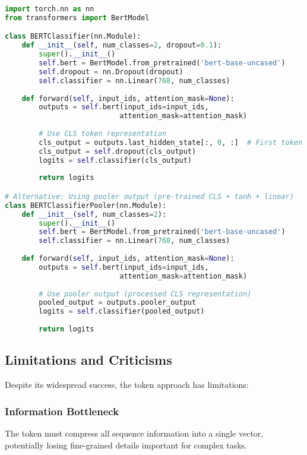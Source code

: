 \begin{lstlisting}[language=Python, caption=Fine-tuning CLS Token]
import torch.nn as nn
from transformers import BertModel

class BERTClassifier(nn.Module):
    def __init__(self, num_classes=2, dropout=0.1):
        super().__init__()
        self.bert = BertModel.from_pretrained('bert-base-uncased')
        self.dropout = nn.Dropout(dropout)
        self.classifier = nn.Linear(768, num_classes)
        
    def forward(self, input_ids, attention_mask=None):
        outputs = self.bert(input_ids=input_ids, 
                           attention_mask=attention_mask)
        
        # Use CLS token representation
        cls_output = outputs.last_hidden_state[:, 0, :]  # First token
        cls_output = self.dropout(cls_output)
        logits = self.classifier(cls_output)
        
        return logits

# Alternative: Using pooler output (pre-trained CLS + tanh + linear)
class BERTClassifierPooler(nn.Module):
    def __init__(self, num_classes=2):
        super().__init__()
        self.bert = BertModel.from_pretrained('bert-base-uncased')
        self.classifier = nn.Linear(768, num_classes)
        
    def forward(self, input_ids, attention_mask=None):
        outputs = self.bert(input_ids=input_ids, 
                           attention_mask=attention_mask)
        
        # Use pooler output (processed CLS representation)
        pooled_output = outputs.pooler_output
        logits = self.classifier(pooled_output)
        
        return logits
\end{lstlisting}

\subsection{Limitations and Criticisms}

Despite its widespread success, the \cls{} token approach has limitations:

\subsubsection{Information Bottleneck}
The \cls{} token must compress all sequence information into a single vector, potentially losing fine-grained details important for complex tasks.


